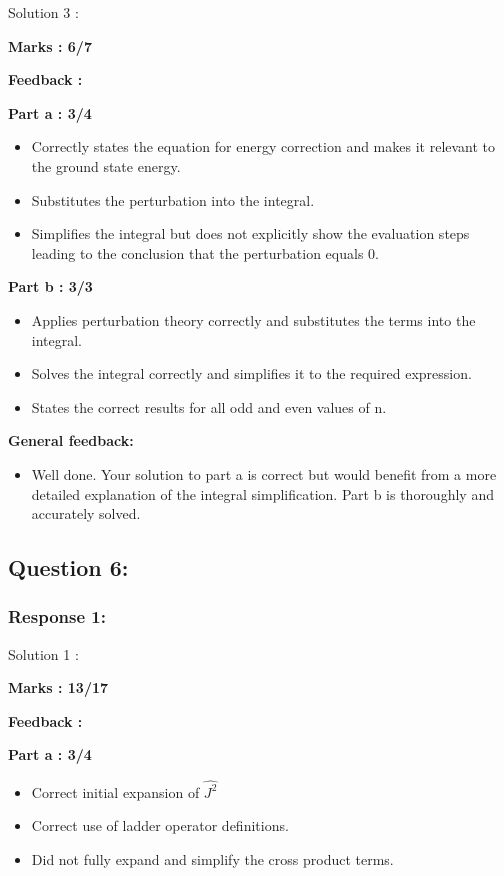 \documentclass[a4paper,11pt]{article}
\begin{document}
Solution 3 :

\textbf{Marks : 6/7}

\textbf{Feedback :}

\textbf{Part a : 3/4}

\begin{itemize}
    \item Correctly states the equation for energy correction and makes it relevant to the ground state energy.
    \item Substitutes the perturbation into the integral.
    \item Simplifies the integral but does not explicitly show the evaluation steps leading to the conclusion that the perturbation equals 0.
\end{itemize}


\textbf{Part b : 3/3}

\begin{itemize}
    \item Applies perturbation theory correctly and substitutes the terms into the integral.
    \item Solves the integral correctly and simplifies it to the required expression.
    \item States the correct results for all odd and even values of n.
\end{itemize}

\textbf{General feedback:}

\begin{itemize}
    \item Well done. Your solution to part a is correct but would benefit from a more detailed explanation of the integral simplification. Part b is thoroughly and accurately solved.
\end{itemize}



\subsection*{Question 6:}

\subsubsection*{Response 1:}


Solution 1 :

\textbf{Marks : 13/17}

\textbf{Feedback : }

\textbf{Part a : 3/4}

\begin{itemize}
    \item Correct initial expansion of $\hat{J^2}$
    \item Correct use of ladder operator definitions.
    \item Did not fully expand and simplify the cross product terms.
\end{itemize}
\end{document}
